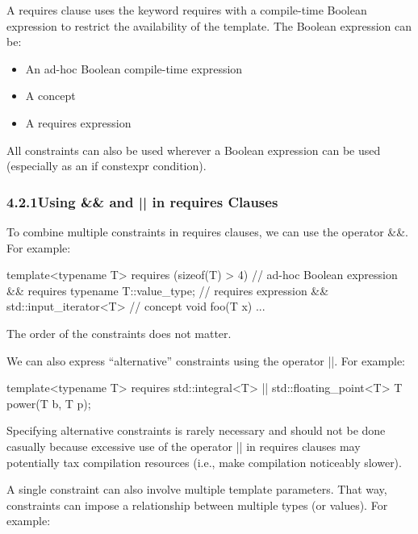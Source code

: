 A requires clause uses the keyword requires with a compile-time Boolean expression to restrict the availability of the template. The Boolean expression can be:

\begin{itemize}
\item
An ad-hoc Boolean compile-time expression

\item
A concept

\item
A requires expression
\end{itemize}

All constraints can also be used wherever a Boolean expression can be used (especially as an if constexpr condition).


\subsubsection*{ 4.2.1\hspace{0.2cm}Using \&\& and || in requires Clauses}

To combine multiple constraints in requires clauses, we can use the operator \&\&. For example:

\begin{cpp}
template<typename T>
requires (sizeof(T) > 4) // ad-hoc Boolean expression
			&& requires { typename T::value_type; } // requires expression
			&& std::input_iterator<T> // concept
void foo(T x) {
	...
}
\end{cpp}

The order of the constraints does not matter.

We can also express “alternative” constraints using the operator ||. For example:

\begin{cpp}
template<typename T>
requires std::integral<T> || std::floating_point<T>
T power(T b, T p);
\end{cpp}

Specifying alternative constraints is rarely necessary and should not be done casually because excessive use of the operator || in requires clauses may potentially tax compilation resources (i.e., make compilation noticeably slower).

A single constraint can also involve multiple template parameters. That way, constraints can impose a relationship between multiple types (or values). For example:

